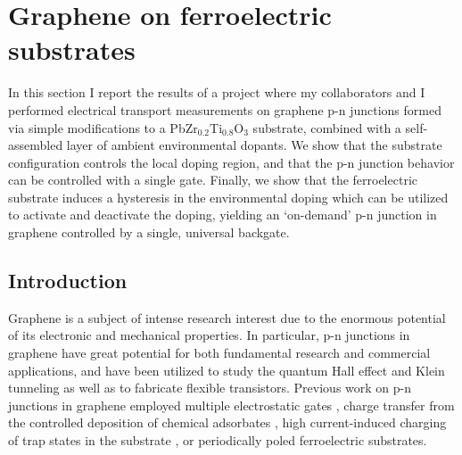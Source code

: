\documentclass[edeposit,fullpage,draftthesis]{uiucthesis2009}
\begin{document}
\section{Graphene on ferroelectric substrates}


    In this section I report the results of a project where my collaborators and I performed electrical transport measurements on graphene p-n junctions formed via simple modifications to a PbZr$_{0.2}$Ti$_{0.8}$O$_3$ substrate, combined with a self-assembled layer of ambient environmental dopants. We show that the substrate configuration controls the local doping region, and that the p-n junction behavior can be controlled with a single gate. Finally, we show that the ferroelectric substrate induces a hysteresis in the environmental doping which can be utilized to activate and deactivate the doping, yielding an `on-demand' p-n junction in graphene controlled by a single, universal backgate.

    \subsection{Introduction}
    
        Graphene is a subject of intense research interest due to the enormous potential of its electronic and mechanical properties\cite{Geim2007}. In particular, p-n junctions in graphene have great potential for both fundamental research and commercial applications, and have been utilized to study the quantum Hall effect \cite{Williams2007, Ozyilmaz2007, Velasco2010} and Klein tunneling\cite{Stander2009, Young2009} as well as to fabricate flexible transistors\cite{Kim2010}. Previous work on p-n junctions in graphene employed multiple electrostatic gates \cite{Meric2008, Williams2007, Ozyilmaz2007, Huard2007, Liu2008, Stander2009, Velasco2009, Velasco2010, Young2009}, charge transfer from the controlled deposition of chemical adsorbates \cite{Farmer2009,Lohmann2009,Brenner2010,Cheng2011,Sojoudi2012,Seo2014,Park2015}, high current-induced charging of trap states in the substrate \cite{Chiu2010}, or periodically poled ferroelectric substrates\cite{Baeumer2015}.
\end{document}
